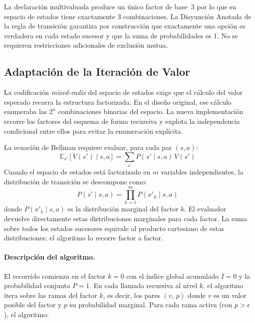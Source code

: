 La declaración multivaluada produce un único factor de base~3 por lo que su espacio de estados tiene exactamente 3 combinaciones. La Disyunción Anotada de la regla de transición garantiza por construcción que exactamente una opción es verdadera en cada estado sucesor y que la suma de probabilidades es 1. No se requieren restricciones adicionales de exclusión mutua.


\subsection{Adaptación de la Iteración de Valor}
\label{sec:di-value-iteration}

La codificación \textit{mixed-radix} del espacio de estados exige que el cálculo
del valor esperado recorra la estructura factorizada. En el diseño original, ese
cálculo enumeraba las $2^n$ combinaciones binarias del espacio. La nueva
implementación recorre los factores del esquema de forma recursiva y explota la
independencia condicional entre ellos para evitar la enumeración explícita.

La ecuación de Bellman requiere evaluar, para cada par $(s, a)$:
\begin{equation}
    \mathbb{E}_{s'}[V(s') \mid s, a]
    = \sum_{s'} P(s' \mid s, a)\, V(s')
    \label{eq:expected-value}
\end{equation}
Cuando el espacio de estados está factorizado en $m$ variables independientes, la
distribución de transición se descompone como:
\begin{equation}
    P(s' \mid s, a) = \prod_{k=1}^{m} P(x'_k \mid s, a)
    \label{eq:factorizacion-transicion}
\end{equation}
donde $P(x'_k \mid s, a)$ es la distribución marginal del factor $k$. El
evaluador devuelve directamente estas distribuciones marginales para cada factor.
La suma sobre todos los estados sucesores equivale al producto cartesiano de
estas distribuciones; el algoritmo lo recorre factor a factor.

\paragraph{Descripción del algoritmo.}
El recorrido comienza en el factor $k = 0$ con el índice global acumulado $I = 0$
y la probabilidad conjunta $P = 1$. En cada llamada recursiva al nivel $k$, el
algoritmo itera sobre las ramas del factor $k$, es decir, los pares
$(v,\, p)$ donde $v$ es un valor posible del factor y $p$ su probabilidad
marginal. Para cada rama activa (con $p > \epsilon$), el algoritmo:

